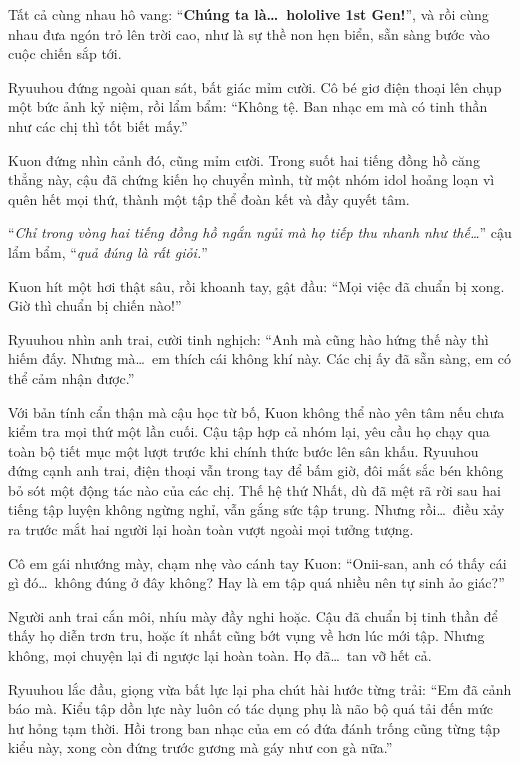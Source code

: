 \documentclass[../main.tex]{subfiles}
\begin{document}
Tất cả cùng nhau hô vang: ``\textbf{Chúng ta là\dots\ hololive 1st Gen!}'', và rồi cùng nhau đưa ngón trỏ lên trời cao, như là sự thề non hẹn biển, sẵn sàng bước vào cuộc chiến sắp tới.

Ryuuhou đứng ngoài quan sát, bất giác mỉm cười. Cô bé giơ điện thoại lên chụp một bức ảnh kỷ niệm, rồi lẩm bẩm: ``Không tệ. Ban nhạc em mà có tinh thần như các chị thì tốt biết mấy.''

Kuon đứng nhìn cảnh đó, cũng mỉm cười. Trong suốt hai tiếng đồng hồ căng thẳng này, cậu đã chứng kiến họ chuyển mình, từ một nhóm idol hoảng loạn vì quên hết mọi thứ, thành một tập thể đoàn kết và đầy quyết tâm.

``\textit{Chỉ trong vòng hai tiếng đồng hồ ngắn ngủi mà họ tiếp thu nhanh như thế\dots}'' cậu lẩm bẩm, ``\textit{quả đúng là rất giỏi.}''

Kuon hít một hơi thật sâu, rồi khoanh tay, gật đầu: ``Mọi việc đã chuẩn bị xong. Giờ thì chuẩn bị chiến nào!''

Ryuuhou nhìn anh trai, cười tinh nghịch: ``Anh mà cũng hào hứng thế này thì hiếm đấy. Nhưng mà\dots\ em thích cái không khí này. Các chị ấy đã sẵn sàng, em có thể cảm nhận được.''

\omk

Với bản tính cẩn thận mà cậu học từ bố, Kuon không thể nào yên tâm nếu chưa kiểm tra mọi thứ một lần cuối. Cậu tập hợp cả nhóm lại, yêu cầu họ chạy qua toàn bộ tiết mục một lượt trước khi chính thức bước lên sân khấu. Ryuuhou đứng cạnh anh trai, điện thoại vẫn trong tay để bấm giờ, đôi mắt sắc bén không bỏ sót một động tác nào của các chị. Thế hệ thứ Nhất, dù đã mệt rã rời sau hai tiếng tập luyện không ngừng nghỉ, vẫn gắng sức tập trung. Nhưng rồi\dots\ điều xảy ra trước mắt hai người lại hoàn toàn vượt ngoài mọi tưởng tượng.

Cô em gái nhướng mày, chạm nhẹ vào cánh tay Kuon: ``Onii-san, anh có thấy cái gì đó\dots\ không đúng ở đây không? Hay là em tập quá nhiều nên tự sinh ảo giác?''

Người anh trai cắn môi, nhíu mày đầy nghi hoặc. Cậu đã chuẩn bị tinh thần để thấy họ diễn trơn tru, hoặc ít nhất cũng bớt vụng về hơn lúc mới tập. Nhưng không, mọi chuyện lại đi ngược lại hoàn toàn. Họ đã\dots\ tan vỡ hết cả.

Ryuuhou lắc đầu, giọng vừa bất lực lại pha chút hài hước từng trải: ``Em đã cảnh báo mà. Kiểu tập dồn lực này luôn có tác dụng phụ là não bộ quá tải đến mức hư hỏng tạm thời. Hồi trong ban nhạc của em có đứa đánh trống cũng từng tập kiểu này, xong còn đứng trước gương mà gáy như con gà nữa.''
\end{document}
